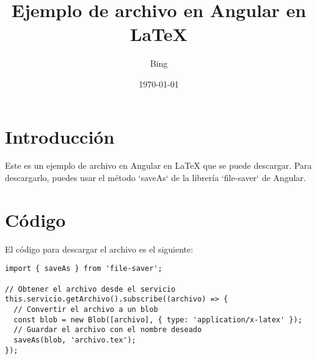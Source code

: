 \documentclass{article}
\title{Ejemplo de archivo en Angular en LaTeX}
\author{Bing}
\date{\today}
\begin{document}
\maketitle

\section{Introducción}

Este es un ejemplo de archivo en Angular en LaTeX que se puede descargar. Para descargarlo, puedes usar el método `saveAs` de la librería `file-saver` de Angular.

\section{Código}

El código para descargar el archivo es el siguiente:

\begin{verbatim}
import { saveAs } from 'file-saver';

// Obtener el archivo desde el servicio
this.servicio.getArchivo().subscribe((archivo) => {
  // Convertir el archivo a un blob
  const blob = new Blob([archivo], { type: 'application/x-latex' });
  // Guardar el archivo con el nombre deseado
  saveAs(blob, 'archivo.tex');
});
\end{verbatim}
\end{document}
